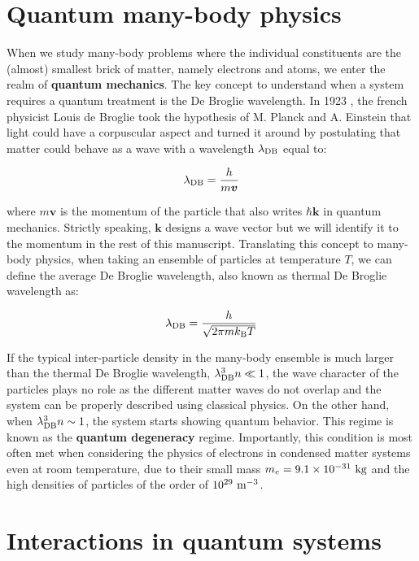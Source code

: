\section*{Quantum many-body physics}

When we study many-body problems where the individual constituents are the (almost) smallest brick of matter, namely electrons and atoms, we enter the realm of \textbf{quantum mechanics}. The key concept to understand when a system requires a quantum treatment is the De Broglie wavelength. In 1923 \cite{debroglie:tel-00006807}, the french physicist Louis de Broglie took the hypothesis of M. Planck and A. Einstein that light could have a corpuscular aspect and turned it around by postulating that matter could behave as a wave with a wavelength $\lambda_{\rm{DB}}$ equal to:

\begin{equation}
    \lambda_{\rm{DB}} = \frac{h}{m\bm{v}}
\end{equation}

\noindent where $m\bm{v}$ is the momentum of the particle that also writes $\hbar \bm{k}$ in quantum mechanics. Strictly speaking, $\bm{k}$ designs a wave vector but we will identify it to the momentum in the rest of this manuscript. Translating this concept to many-body physics, when taking an ensemble of particles at temperature $T$, we can define the average De Broglie wavelength, also known as thermal De Broglie wavelength as:

\begin{equation}
    \lambda_{\rm{DB}} = \frac{h}{\sqrt{2 \pi m k_{\mathrm{B}} T}}
\end{equation}

\noindent If the typical inter-particle density in the many-body ensemble is much larger than the thermal De Broglie wavelength, \ie $\lambda_{\rm{DB}}^3 n \ll 1$, the wave character of the particles plays no role as the different matter waves do not overlap and the system can be properly described using classical physics. On the other hand, when $\lambda_{\rm{DB}}^3 n \sim 1$, the system starts showing quantum behavior. This regime is known as the \textbf{quantum degeneracy} regime. Importantly, this condition is most often met when considering the physics of electrons in condensed matter systems even at room temperature, due to their small mass $m_e = 9.1 \times 10^{-31} \ \rm{kg}$ and the high densities of particles of the order of $10^{29} \ \rm{m}^{-3}$.

\section*{Interactions in quantum systems}

